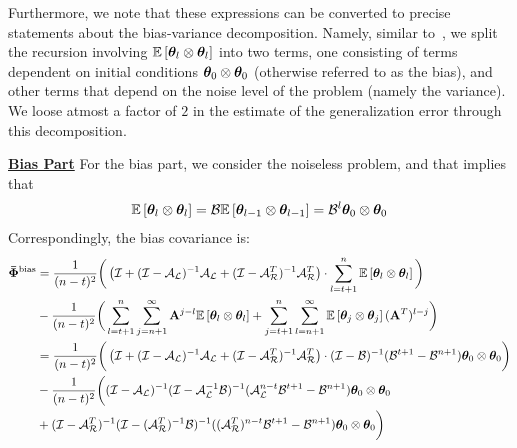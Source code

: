 \iffalse
We have brought out the leading order terms in the expansion through adding and subtracting terms in the summation.
\begin{align*}
\phivb_{t,N}&=\frac{1}{(n-t)^2}\bigg((\eye-\A)^{-1}\A\sum_{l=t+1}^n\E{\thetav_l\otimes\thetav_l} + \sum_{l=t+1}^n\E{\thetav_l\otimes\thetav_l^T}+\sum_{j=t+1}^n\E{\thetav_j\otimes\thetav_j}(\eye-\A^T)^{-1}\A^T\nonumber\\
&-\sum_{l=t+1}^n\sum_{j=n+1}^{\infty}\A^{j-l}\E{\thetav_l\otimes\thetav_l} -\sum_{j=t+1}^n\sum_{l=n+1}^{\infty}\E{\thetav_j\otimes\thetav_j}(\A^T)^{l-j}\bigg)\nonumber\\
&=\frac{1}{(n-t)^2}\bigg(\left(\eyeT+(\eyeT-\AL)^{-1}\AL+(\eyeT-\AR^T)^{-1}\AR^T\right)\cdot\sum_{l=t+1}^n\E{\thetav_l\otimes\thetav_l}\bigg)\nonumber\\
&-\frac{1}{(n-t)^2}\bigg(\sum_{l=t+1}^n\sum_{j=n+1}^{\infty}\A^{j-l}\E{\thetav_l\otimes\thetav_l} +\sum_{j=t+1}^n\sum_{l=n+1}^{\infty}\E{\thetav_j\otimes\thetav_j}(\A^T)^{l-j}\bigg)
\end{align*}
\fi
\iffalse
Furthermore, we note that these expressions can be converted to precise statements about the bias-variance decomposition. Namely, similar to~\cite{BachM13,DefossezB15,JainKKNS16}, we split the recursion involving $\mathbb{E}\left[\boldsymbol{\theta}_l\otimes\boldsymbol{\theta}_l\right]$ into two terms, one consisting of terms dependent on initial conditions $\boldsymbol{\theta}_0\otimes\boldsymbol{\theta}_0$ (otherwise referred to as the bias), and other terms that depend on the noise level of the problem (namely the variance). We loose atmost a factor of $2$ in the estimate of the generalization error through this decomposition.

\underline{\bf Bias Part}
For the bias part, we consider the noiseless problem, and that implies that
\begin{align*} \mathbb{E}\left[\boldsymbol{\theta}_l\otimes\boldsymbol{\theta}_l\right]=\mathcal{B}\mathbb{E}\left[\boldsymbol{\theta}_{l-1}\otimes\boldsymbol{\theta}_{l-1}\right]=\mathcal{B}^l\boldsymbol{\theta}_0\otimes\boldsymbol{\theta}_0
\end{align*}
Correspondingly, the bias covariance is:
\begin{align*}
\boldsymbol{\bar{\Phi}}^{\text{bias}}&=\frac{1}{(n-t)^2}\bigg(\left(\mathcal{I}+(\mathcal{I}-\mathcal{A}_{\mathcal{L}})^{-1}\mathcal{A}_{\mathcal{L}}+(\mathcal{I}-\mathcal{A}_{\mathcal{R}}^T)^{-1}\mathcal{A}_{\mathcal{R}}^T\right)\cdot\sum_{l=t+1}^n\mathbb{E}\left[\boldsymbol{\theta}_l\otimes\boldsymbol{\theta}_l\right]\bigg)\nonumber\\
&-\frac{1}{(n-t)^2}\bigg(\sum_{l=t+1}^n\sum_{j=n+1}^{\infty}\mathbf{A}^{j-l}\mathbb{E}\left[\boldsymbol{\theta}_l\otimes\boldsymbol{\theta}_l\right] +\sum_{j=t+1}^n\sum_{l=n+1}^{\infty}\mathbb{E}\left[\boldsymbol{\theta}_j\otimes\boldsymbol{\theta}_j\right](\mathbf{A}^T)^{l-j}\bigg)\nonumber\\
&=\frac{1}{(n-t)^2}\bigg(\left(\mathcal{I}+(\mathcal{I}-\mathcal{A}_{\mathcal{L}})^{-1}\mathcal{A}_{\mathcal{L}}+(\mathcal{I}-\mathcal{A}_{\mathcal{R}}^T)^{-1}\mathcal{A}_{\mathcal{R}}^T\right)\cdot(\mathcal{I}-\mathcal{B})^{-1}(\mathcal{B}^{t+1}-\mathcal{B}^{n+1})\boldsymbol{\theta}_0\otimes\boldsymbol{\theta}_0\bigg)\nonumber\\
&-\frac{1}{(n-t)^2}\bigg( (\mathcal{I}-\mathcal{A}_{\mathcal{L}})^{-1} (\mathcal{I}-\mathcal{A}_{\mathcal{L}}^{-1}\mathcal{B})^{-1}(\mathcal{A}_{\mathcal{L}}^{n-t}\mathcal{B}^{t+1}-\mathcal{B}^{n+1})\boldsymbol{\theta}_0\otimes\boldsymbol{\theta}_0 \ \nonumber\\ &+ (\mathcal{I}-\mathcal{A}_{\mathcal{R}}^T)^{-1}(\mathcal{I}-(\mathcal{A}_{\mathcal{R}}^T)^{-1}\mathcal{B})^{-1}((\mathcal{A}_{\mathcal{R}}^T)^{n-t}\mathcal{B}^{t+1}-\mathcal{B}^{n+1})\boldsymbol{\theta}_0\otimes\boldsymbol{\theta}_0\bigg)
\end{align*}


